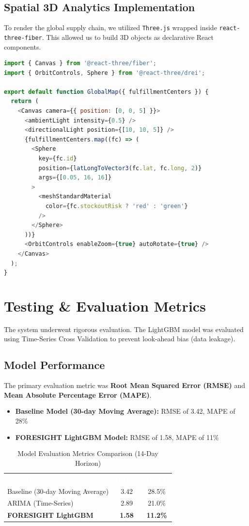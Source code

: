 \documentclass[12pt,a4paper]{report}
\begin{document}
\subsection{Spatial 3D Analytics Implementation}
To render the global supply chain, we utilized \texttt{Three.js} wrapped inside \texttt{react-three-fiber}. This allowed us to build 3D objects as declarative React components. 

\begin{lstlisting}[language=JavaScript, caption=React Component for Rendering 3D Fulfillment Centers]
import { Canvas } from '@react-three/fiber';
import { OrbitControls, Sphere } from '@react-three/drei';

export default function GlobalMap({ fulfillmentCenters }) {
  return (
    <Canvas camera={{ position: [0, 0, 5] }}>
      <ambientLight intensity={0.5} />
      <directionalLight position={[10, 10, 5]} />
      {fulfillmentCenters.map((fc) => (
        <Sphere 
          key={fc.id} 
          position={latLongToVector3(fc.lat, fc.long, 2)} 
          args={[0.05, 16, 16]}
        >
          <meshStandardMaterial 
            color={fc.stockoutRisk ? 'red' : 'green'} 
          />
        </Sphere>
      ))}
      <OrbitControls enableZoom={true} autoRotate={true} />
    </Canvas>
  );
}
\end{lstlisting}

\section{Testing \& Evaluation Metrics}
The system underwent rigorous evaluation. The LightGBM model was evaluated using Time-Series Cross Validation to prevent look-ahead bias (data leakage). 

\subsection{Model Performance}
The primary evaluation metric was \textbf{Root Mean Squared Error (RMSE)} and \textbf{Mean Absolute Percentage Error (MAPE)}.
\begin{itemize}
    \item \textbf{Baseline Model (30-day Moving Average):} RMSE of 3.42, MAPE of 28\%
    \item \textbf{FORESIGHT LightGBM Model:} RMSE of 1.58, MAPE of 11\%
\end{itemize}

\begin{table}[h]
\centering
\renewcommand{\arraystretch}{1.5}
\caption{Model Evaluation Metrics Comparison (14-Day Horizon)}
\begin{tabularx}{\textwidth}{X c c}
\rowcolor{zidiopurple}
\textcolor{white}{\textbf{Model}} & \textcolor{white}{\textbf{RMSE}} & \textcolor{white}{\textbf{MAPE}} \\
\rowcolor{zidiogray!30}
Baseline (30-day Moving Average) & 3.42 & 28.5\% \\
ARIMA (Time-Series) & 2.89 & 21.0\% \\
\rowcolor{zidiogray!30}
\textbf{FORESIGHT LightGBM} & \textbf{1.58} & \textbf{11.2\%} \\
\end{tabularx}
\end{table}
\end{document}
